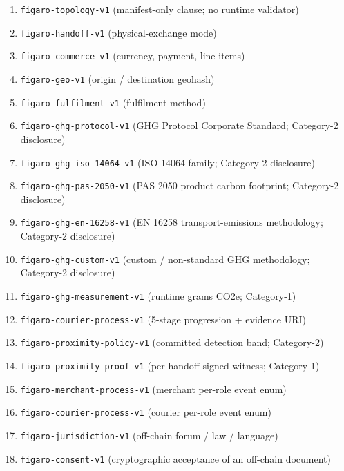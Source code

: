 \documentclass[11pt,a4paper]{article}
\theoremstyle{definition}
\theoremstyle{remark}
\begin{document}
\begin{enumerate}
  \item \texttt{figaro-topology-v1} (manifest-only clause; no runtime
    validator)
  \item \texttt{figaro-handoff-v1} (physical-exchange mode)
  \item \texttt{figaro-commerce-v1} (currency, payment, line items)
  \item \texttt{figaro-geo-v1} (origin / destination geohash)
  \item \texttt{figaro-fulfilment-v1} (fulfilment method)
  \item \texttt{figaro-ghg-protocol-v1} (GHG Protocol Corporate
    Standard; Category-2 disclosure)
  \item \texttt{figaro-ghg-iso-14064-v1} (ISO 14064 family;
    Category-2 disclosure)
  \item \texttt{figaro-ghg-pas-2050-v1} (PAS 2050 product carbon
    footprint; Category-2 disclosure)
  \item \texttt{figaro-ghg-en-16258-v1} (EN 16258 transport-emissions
    methodology; Category-2 disclosure)
  \item \texttt{figaro-ghg-custom-v1} (custom / non-standard GHG
    methodology; Category-2 disclosure)
  \item \texttt{figaro-ghg-measurement-v1} (runtime grams CO2e;
    Category-1)
  \item \texttt{figaro-courier-process-v1} (5-stage progression
    + evidence URI)
  \item \texttt{figaro-proximity-policy-v1} (committed detection
    band; Category-2)
  \item \texttt{figaro-proximity-proof-v1} (per-handoff signed
    witness; Category-1)
  \item \texttt{figaro-merchant-process-v1} (merchant per-role event
    enum)
  \item \texttt{figaro-courier-process-v1} (courier per-role event
    enum)
  \item \texttt{figaro-jurisdiction-v1} (off-chain forum / law /
    language)
  \item \texttt{figaro-consent-v1} (cryptographic acceptance of an
    off-chain document)
\end{enumerate}
\end{document}
